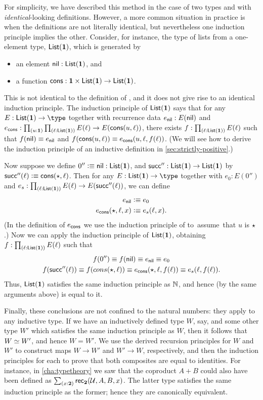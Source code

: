 For simplicity, we have described this method in the case of two types \nat and \natp with \emph{identical}-looking definitions.
However, a more common situation in practice is when the definitions are not literally identical, but nevertheless one induction principle implies the other.
Consider, for instance, the type of lists from a one-element type, $\mathsf{List}(\mathbf{1})$, which is generated by
\begin{itemize}
\item an element $\mathsf{nil}:\mathsf{List}(\mathbf{1})$, and
\item a function $\mathsf{cons}:\mathbf{1} \times \mathsf{List}(\mathbf{1}) \to\mathsf{List}(\mathbf{1})$.
\end{itemize}
This is not identical to the definition of \nat, and it does not give rise to an identical induction principle.
The induction principle of $\mathsf{List}(\mathbf{1})$ says that for any $E:\lst\unit\to\type$ together with recurrence data $e_{\mathsf{nil}}:E(\mathsf{nil})$ and $e_\cons : \prd{u:\unit}{\ell:\lst\unit} E(\ell) \to E(\cons(u,\ell))$, there exists $f:\prd{\ell:\lst\unit} E(\ell)$ such that $f(\mathsf{nil})\equiv e_{\mathsf{nil}}$ and $f(\mathsf{cons}(u,\ell))\equiv e_{\mathsf{cons}}(u,\ell,f(\ell))$.
(We will see how to derive the induction principle of an inductive definition in \autoref{sec:strictly-positive}.)

Now suppose we define $0'' \vcentcolon\equiv \mathsf{nil}: \mathsf{List}(\mathbf{1})$, and $\mathsf{succ}'':\mathsf{List}(\mathbf{1})\to\mathsf{List}(\mathbf{1})$ by $\mathsf{succ}''(\ell) \vcentcolon\equiv \mathsf{cons}(\star,\ell)$.
Then for any $E:\lst\unit\to\type$ together with $e_0:E(0'')$ and $e_s:\prd{\ell:\lst\unit} E(\ell) \to E(\suc''(\ell))$, we can define
\begin{align*}
  e_{\mathsf{nil}} &\vcentcolon\equiv e_0\\
  e_{\mathsf{cons}}(\star,\ell,x) &\vcentcolon\equiv e_s(\ell,x).
\end{align*}
(In the definition of $e_{\mathsf{cons}}$ we use the induction principle of \unit to assume that $u$ is $\star$.)
Now we can apply the induction principle of $\mathsf{List}(\mathbf{1})$, obtaining $f:\prd{\ell:\lst\unit} E(\ell)$ such that
\begin{gather*}
  f(0'') \equiv f(\mathsf{nil}) \equiv e_{\mathsf{nil}} \equiv e_0\\
  f(\mathsf{succ}''(\ell)) \equiv f(cons(\star,\ell)) \equiv e_{\mathsf{cons}}(\star,\ell,f(\ell)) \equiv e_s(\ell,f(\ell)).
\end{gather*}
Thus, $\mathsf{List}(\mathbf{1})$ satisfies the same induction principle as $\mathbb{N}$, and hence (by the same arguments above) is equal to it.

Finally, these conclusions are not confined to the natural numbers: they apply to any inductive type.
If we have an inductively defined type $W$, say, and some other type $W'$ which satisfies the same induction principle as $W$, then it follows that $W \simeq W'$, and hence $W=W'$.
We use the derived recursion principles for $W$ and $W'$ to construct maps $W\to W'$ and $W'\to W$, respectively, and then the induction principles for each to prove that both composites are equal to identities.
For instance, in \autoref{cha:typetheory} we saw that the coproduct $A+B$ could also have been defined as $\sm{x:\bool} \rec{\bool}(\UU,A,B,x)$.
The latter type satisfies the same induction principle as the former; hence they are canonically equivalent.

